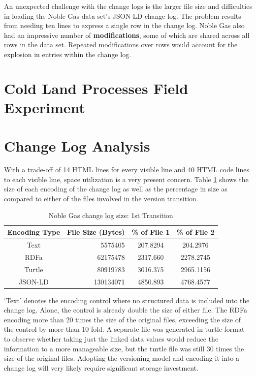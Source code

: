 An unexpected challenge with the change logs is the larger file size and difficulties in loading the Noble Gas data set's JSON-LD change log.
The problem results from needing ten lines to express a single row in the change log.
Noble Gas also had an impressive number of \textbf{modifications}, some of which are shared across all rows in the data set.
Repeated modifications over rows would account for the explosion in entries within the change log.

\section{Cold Land Processes Field Experiment}



\section{Change Log Analysis}

With a trade-off of 14 HTML lines for every visible line and 40 HTML code lines to each visible line, space utilization is a very present concern.
Table \ref{table:Ng_changelog_table1} shows the size of each encoding of the change log as well as the percentage in size as compared to either of the files involved in the version transition.
\begin{table}
	\caption{Noble Gas change log size: 1st Transition}
	\label{table:Ng_changelog_table1}
	\centering
	\begin{tabular}{|c|r|c|c|}
		\hline
		Encoding Type & File Size (Bytes) & \% of File 1 & \% of File 2 \\
		\hline
		Text&	5575405&	207.8294&	204.2976\\
		RDFa&	62175478&	2317.660&	2278.2745\\
		Turtle&	80919783&	3016.375&	2965.1156\\
		JSON-LD&	130134071&	4850.893&	4768.4577\\
		\hline
	\end{tabular}
\end{table}
`Text' denotes the encoding control where no structured data is included into the change log.
Alone, the control is already double the size of either file.
The RDFa encoding more than 20 times the size of the original files, exceeding the size of the control by more than 10 fold.
A separate file was generated in turtle format to observe whether taking just the linked data values would reduce the information to a more manageable size, but the turtle file was still 30 times the size of the original files.
Adopting the versioning model and encoding it into a change log will very likely require significant storage investment.

